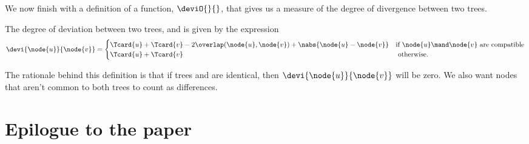 \begin{definition}



\end{definition}


We now finish with a definition of a function, $\deviO{}{}$, that gives us a
measure of the degree of divergence between two trees.
\begin{definition}\label{defdeviation}
  The degree of deviation between two trees,  and  is given  by the expression
  \begin{equation}
    \devi{\node{u}}{\node{v}} = \begin{cases}
      \Tcard{u} + \Tcard{v} - 2\overlap(\node{u},\node{v}) + \nabs{\node{u} - \node{v}}&\text{if }\node{u} \mand \node{v} \text{ are compatible} \\
      \Tcard{u} + \Tcard{v} & \text{ otherwise.}
    \end{cases}
  \end{equation}
  
  The rationale behind this definition is that if trees  and  are identical, then
  $\devi{\node{u}}{\node{v}}$ will be zero. We also want nodes that aren't common to both trees to
  count as differences.
\end{definition}

\section{Epilogue to the paper}

